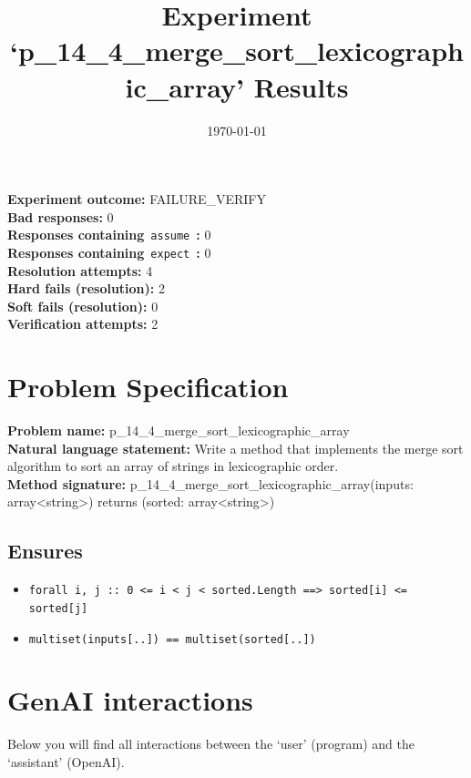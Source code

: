 \documentclass{article}
\begin{document}
\title{Experiment `p\_14\_4\_merge\_sort\_lexicographic\_array' Results}
\author{\today}
\date{}
\maketitle
\textbf{Experiment outcome: }FAILURE\_VERIFY
\\\textbf{Bad responses: }0
\\\textbf{Responses containing}~\texttt{assume}~\textbf{: }0
\\\textbf{Responses containing}~\texttt{expect}~\textbf{: }0
\\\textbf{Resolution attempts: }4
\\\textbf{Hard fails (resolution): }2
\\\textbf{Soft fails (resolution): }0
\\\textbf{Verification attempts: }2
\section*{Problem Specification}
\textbf{Problem name: }p\_14\_4\_merge\_sort\_lexicographic\_array
\\\textbf{Natural language statement: }Write a method that implements the merge sort algorithm to sort an array of strings in lexicographic order.
\\\textbf{Method signature: }p\_14\_4\_merge\_sort\_lexicographic\_array(inputs: array<string>) returns (sorted: array<string>)
\subsection*{Ensures}
\begin{itemize}
\item \texttt{forall i, j :: 0 <= i < j < sorted.Length ==> sorted[i] <= sorted[j]}
\item \texttt{multiset(inputs[..]) == multiset(sorted[..])}
\end{itemize}
\clearpage
\section*{GenAI interactions}
Below you will find all interactions between the `user' (program) and the `assistant' (OpenAI).
\end{document}
